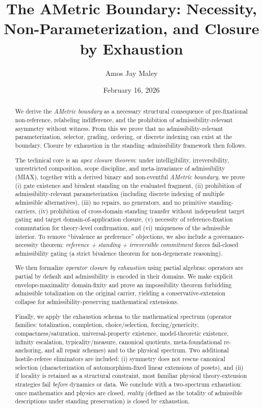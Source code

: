\documentclass[11pt]{article}
\title{\textbf{The AMetric Boundary: Necessity, Non-Parameterization, and Closure by Exhaustion}\\}
\author{Amos Jay Maley}
\date{February 16, 2026}
\theoremstyle{definition}
\begin{document}
\maketitle

\begin{abstract}
We derive the \emph{AMetric boundary} as a necessary structural consequence of pre-fixational non-reference, relabeling indifference, and the prohibition of admissibility-relevant asymmetry without witness.
From this we prove that no admissibility-relevant parameterization, selector, grading, ordering, or discrete indexing can exist at the boundary.
Closure by exhaustion in the standing--admissibility framework then follows.

The technical core is an \emph{apex closure theorem}: under intelligibility, irreversibility, unrestricted composition, scope discipline, and meta-invariance of admissibility (MIAX), together with a derived binary and non-eventful \emph{AMetric boundary}, we prove (i) gate existence and bivalent standing on the evaluated fragment, (ii) prohibition of admissibility-relevant parameterization (including discrete indexing of multiple admissible alternatives), (iii) no repairs, no generators, and no primitive standing-carriers, (iv) prohibition of cross-domain standing transfer without independent target gating and target domain-of-application closure, (v) necessity of reference-fixation commutation for theory-level confirmation, and (vi) uniqueness of the admissible interior.
To remove ``bivalence as preference'' objections, we also include a governance-necessity theorem: \emph{reference + standing + irreversible commitment} forces fail-closed admissibility gating (a strict bivalence theorem for non-degenerate reasoning).

We then formalize \emph{operator closure by exhaustion} using partial algebras: operators are partial by default and admissibility is encoded in their domains.
We make explicit envelope-maximality domain-fixity and prove an impossibility theorem forbidding admissible totalization on the original carrier, yielding a conservative-extension collapse for admissibility-preserving mathematical extensions.

Finally, we apply the exhaustion schema to the mathematical spectrum (operator families: totalization, completion, choice/selection, forcing/genericity, compactness/saturation, universal-property existence, model-theoretic existence, infinity escalation, typicality/measure, canonical quotients, meta-foundational re-anchoring, and all repair schemes) and to the physical spectrum.
Two additional hostile-referee eliminators are included: (i) symmetry does not rescue canonical selection (characterization of automorphism-fixed linear extensions of posets), and (ii) if locality is retained as a structural constraint, most familiar physical theory-extension strategies fail \emph{before} dynamics or data.
We conclude with a two-spectrum exhaustion: once mathematics and physics are closed, \emph{reality} (defined as the totality of admissible descriptions under standing preservation) is closed by exhaustion.


\end{abstract}
\end{document}
